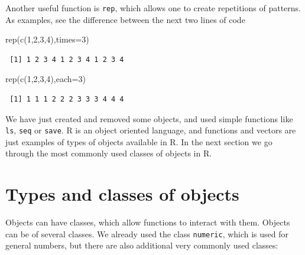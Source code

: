 \documentclass[
  letterpaper,
  DIV=11,
  numbers=noendperiod]{scrartcl}
\newenvironment{Shaded}{\begin{snugshade}}{\end{snugshade}}
\newcommand{\AttributeTok}[1]{\textcolor[rgb]{0.40,0.45,0.13}{#1}}
\newcommand{\DecValTok}[1]{\textcolor[rgb]{0.68,0.00,0.00}{#1}}
\newcommand{\FunctionTok}[1]{\textcolor[rgb]{0.28,0.35,0.67}{#1}}
\newcommand{\NormalTok}[1]{\textcolor[rgb]{0.00,0.23,0.31}{#1}}
\begin{document}
Another useful function is \texttt{rep}, which allows one to create
repetitions of patterns. As examples, see the difference between the
next two lines of code

\begin{Shaded}
\begin{Highlighting}[]
\FunctionTok{rep}\NormalTok{(}\FunctionTok{c}\NormalTok{(}\DecValTok{1}\NormalTok{,}\DecValTok{2}\NormalTok{,}\DecValTok{3}\NormalTok{,}\DecValTok{4}\NormalTok{),}\AttributeTok{times=}\DecValTok{3}\NormalTok{)}
\end{Highlighting}
\end{Shaded}

\begin{verbatim}
 [1] 1 2 3 4 1 2 3 4 1 2 3 4
\end{verbatim}

\begin{Shaded}
\begin{Highlighting}[]
\FunctionTok{rep}\NormalTok{(}\FunctionTok{c}\NormalTok{(}\DecValTok{1}\NormalTok{,}\DecValTok{2}\NormalTok{,}\DecValTok{3}\NormalTok{,}\DecValTok{4}\NormalTok{),}\AttributeTok{each=}\DecValTok{3}\NormalTok{)}
\end{Highlighting}
\end{Shaded}

\begin{verbatim}
 [1] 1 1 1 2 2 2 3 3 3 4 4 4
\end{verbatim}

We have just created and removed some objects, and used simple functions
like \texttt{ls}, \texttt{seq} or \texttt{save}. R is an object oriented
language, and functions and vectors are just examples of types of
objects available in R. In the next section we go through the most
commonly used classes of objects in R.

\section{Types and classes of
objects}\label{types-and-classes-of-objects}

Objects can have classes, which allow functions to interact with them.
Objects can be of several classes. We already used the class
\texttt{numeric}, which is used for general numbers, but there are also
additional very commonly used classes:
\end{document}
